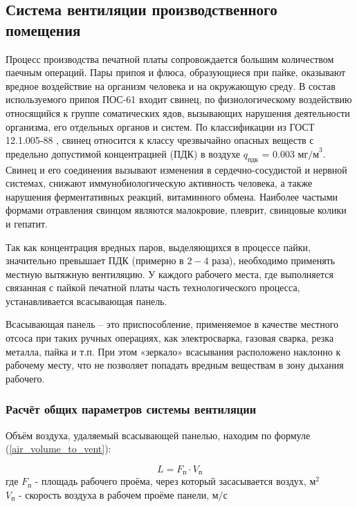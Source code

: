 \clearpage
\subsection{Система вентиляции производственного помещения}
\label{vent_system_calculation}

Процесс производства печатной платы сопровождается большим количеством паечным
операций.
Пары припоя и флюса, образующиеся при пайке, оказывают вредное воздействие на
организм человека и на окружающую среду. В состав используемого припоя ПОС-61
входит свинец, по физиологическому воздействию относящийся к группе соматических
ядов, вызывающих нарушения деятельности организма, его отдельных органов и систем.
По классификации из ГОСТ 12.1.005-88 \cite{ecology_gost_005_88}, свинец относится
к классу чрезвычайно опасных веществ с предельно допустимой концентрацией (ПДК)
в воздухе $q_\text{пдк}$ = 0.003 $\text{мг/м}^3$.
Свинец и его соединения вызывают изменения в сердечно-сосудистой и нервной системах,
снижают иммунобиологическую активность человека, а также нарушения ферментативных
реакций, витаминного обмена. Наиболее частыми формами отравления свинцом являются
малокровие, плеврит, свинцовые колики и гепатит.

Так как концентрация вредных паров, выделяющихся в процессе пайки, значительно
превышает ПДК (примерно в $2 - 4$ раза), необходимо применять местную вытяжную вентиляцию.
У каждого рабочего места, где выполняется связанная с пайкой печатной платы часть
технологического процесса, устанавливается всасывающая панель.

Всасывающая панель – это приспособление, применяемое в качестве местного отсоса
при таких ручных операциях, как электросварка, газовая сварка, резка металла,
пайка и т.п. При этом «зеркало» всасывания расположено наклонно к рабочему месту,
что не позволяет попадать вредным веществам в зону дыхания рабочего.

\subsubsection{Расчёт общих параметров системы вентиляции}

Объём воздуха, удаляемый всасывающей панелью, находим по формуле
(\ref{air_volume_to_vent}):

\begin{equation}
\label{air_volume_to_vent}
    L = F_\text{п} \cdot V_\text{п}
\end{equation}
где $F_\text{п}$ - площадь рабочего проёма, через который засасывается воздух, $\text{м}^2$ \\
$V_\text{п}$ - скорость воздуха в рабочем проёме панели, $\text{м/с}$

